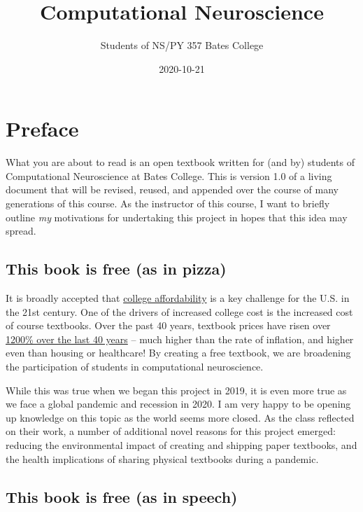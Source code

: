 \documentclass[
]{book}
\title{Computational Neuroscience}
\author{Students of NS/PY 357 Bates College}
\date{2020-10-21}
\begin{document}
\maketitle

{
\setcounter{tocdepth}{1}
\tableofcontents
}
\hypertarget{preface}{%
\chapter{Preface}\label{preface}}

What you are about to read is an open textbook written for (and by) students of Computational Neuroscience at Bates College. This is version 1.0 of a living document that will be revised, reused, and appended over the course of many generations of this course. As the instructor of this course, I want to briefly outline \emph{my} motivations for undertaking this project in hopes that this idea may spread.

\hypertarget{this-book-is-free-as-in-pizza}{%
\section{This book is free (as in pizza)}\label{this-book-is-free-as-in-pizza}}

It is broadly accepted that \href{https://collegecost.ed.gov/}{college affordability} is a key challenge for the U.S. in the 21st century. One of the drivers of increased college cost is the increased cost of course textbooks. Over the past 40 years, textbook prices have risen over \href{https://www.slideshare.net/kcangial/teaching-in-the-open-bates-college}{1200\% over the last 40 years} -- much higher than the rate of inflation, and higher even than housing or healthcare! By creating a free textbook, we are broadening the participation of students in computational neuroscience.

While this was true when we began this project in 2019, it is even more true as we face a global pandemic and recession in 2020. I am very happy to be opening up knowledge on this topic as the world seems more closed. As the class reflected on their work, a number of additional novel reasons for this project emerged: reducing the environmental impact of creating and shipping paper textbooks, and the health implications of sharing physical textbooks during a pandemic.

\hypertarget{this-book-is-free-as-in-speech}{%
\section{This book is free (as in speech)}\label{this-book-is-free-as-in-speech}}
\end{document}
